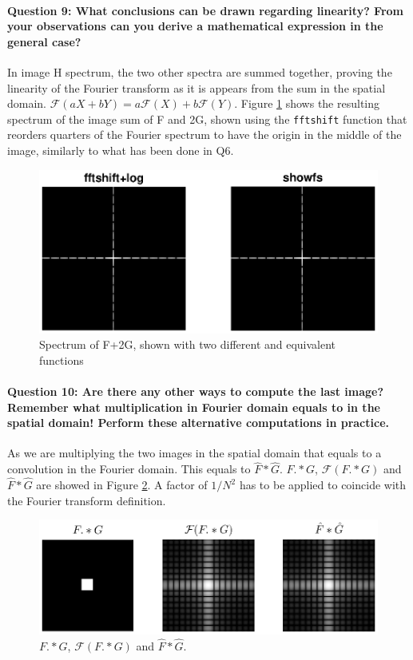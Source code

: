 \documentclass[12pt]{article}
\begin{document}
\paragraph{Question 9: What conclusions can be drawn regarding linearity? From your observations can you derive a mathematical expression in the general case?}
In image H spectrum, the two other spectra are summed together, proving the linearity of the Fourier transform as it is appears from the sum in the spatial domain. \(\mathcal{F}(aX+bY)=a\mathcal{F}(X)+b\mathcal{F}(Y)\). Figure \ref{fig:q7_2} shows the resulting spectrum of the image sum of F and 2G, shown using the \texttt{fftshift} function that reorders quarters of the Fourier spectrum to have the origin in the middle of the image, similarly to what has been done in Q6.

\begin{figure}[htbp]
 \centering
 \includegraphics[width=\textwidth]{q7_2}
 \caption{Spectrum of F+2G, shown with two different and equivalent functions}
 \label{fig:q7_2}
\end{figure}

\paragraph{Question 10: Are there any other ways to compute the last image? Remember what multiplication in Fourier domain equals to in the spatial domain! Perform these alternative
computations in practice.}
As we are multiplying the two images in the spatial domain that equals to a convolution in the Fourier domain. This equals to \(\hat{F}*\hat{G}\). \(F.*G\), \(\mathcal{F}(F.*G)\) and \(\hat{F}*\hat{G}\) are showed in Figure \ref{fig:q10}. A factor of \(1/N^2\) has to be applied to coincide with the Fourier transform definition. 

\begin{figure}[htbp]
 \centering
 \includegraphics[width=\textwidth]{q10}
 \caption{\(F.*G\), \(\mathcal{F}(F.*G)\) and \(\hat{F}*\hat{G}\).}
 \label{fig:q10}
\end{figure}
\end{document}
